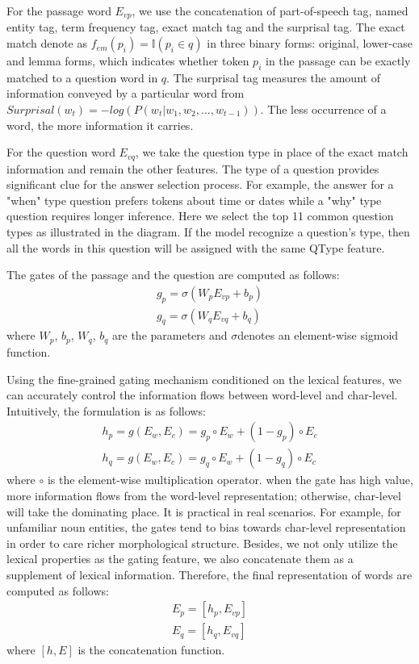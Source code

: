 \documentclass[letterpaper]{article} \usepackage{aaai18}  \usepackage{times}  \usepackage{helvet}  \usepackage{courier}  \usepackage{url}  \usepackage{graphicx}  \usepackage{booktabs}
\begin{document}
   For the passage word $E_{vp}$, we use the concatenation of part-of-speech tag, named entity tag, term frequency tag, exact match tag and the surprisal tag. The exact match denote as $f_{em}(p_i)=\mathbb{I}(p_i \in q)$ in three binary forms: original, lower-case and lemma forms, which indicates whether  token $p_i$ in the passage can be exactly matched to a question word in $q$. The surprisal tag measures the amount of information conveyed by a particular word from  $Surprisal(w_t)=-log(P(w_t|w_1,w_2,...,w_{t-1}))$. The less occurrence of a word, the more information it carries. 
   
   For the question word $E_{vq}$, we take the question type in place of the exact match information and remain the other features. The type of a question provides significant clue for the answer selection process. For example, the answer for a "when" type question prefers tokens about time or dates while a "why" type question requires longer inference. Here we select the top 11 common question types as illustrated in the diagram. If the model recognize a question's type, then all the words in this question will be assigned with the same QType feature.
   
   The gates of the passage and the question are computed as follows:
   \begin{align*}
    g_p=\sigma(W_pE_{vp}+b_p) \\
   g_q=\sigma(W_qE_{vq}+b_q)   \tag{1} 
   \end{align*}
   where $W_p$, $b_p$, $W_q$, $b_q$ are the parameters and  $\sigma$denotes an element-wise sigmoid function.
   
   Using the fine-grained gating mechanism conditioned on the lexical features, we can accurately control the information flows between word-level and char-level. Intuitively, the formulation is as follows:
   \begin{align*}
   h_p=g(E_w,E_c)=g_p\circ E_w+(1-g_p)\circ E_c \\
   h_q=g(E_w,E_c)=g_q\circ E_w+(1-g_q)\circ E_c \tag{2}
   \end{align*}
   where $\circ$ is the element-wise multiplication operator. when the gate has high value, more information flows from the word-level representation; otherwise, char-level will take the dominating place. It is practical in real scenarios. For example, for unfamiliar noun entities, the gates tend to bias towards char-level representation in order to care richer morphological structure. Besides, we not only utilize the lexical properties as the gating feature, we also concatenate them as a supplement of lexical information. Therefore, the final representation of words are computed as follows:
   \begin{align*}
   E_p=[h_p,E_{vp}] \\
   E_q=[h_q,E_{vq}] \tag{3} 
   \end{align*} 
   where $[h,E]$ is the concatenation function.
\end{document}
